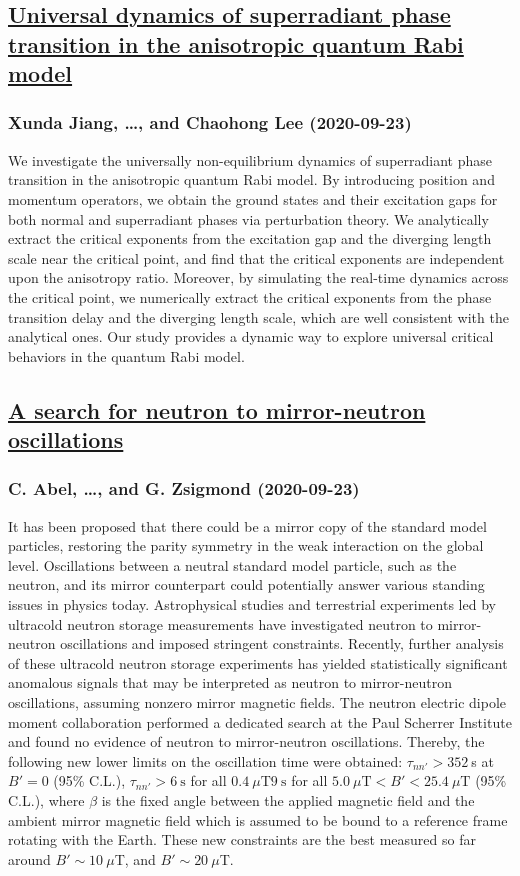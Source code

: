 \subsection*{\href{http://arxiv.org/abs/2009.11047v1}{Universal dynamics of superradiant phase transition in the anisotropic  quantum Rabi model}}
\subsubsection*{Xunda Jiang, \dots, and Chaohong Lee (2020-09-23)}
We investigate the universally non-equilibrium dynamics of superradiant phase
transition in the anisotropic quantum Rabi model. By introducing position and
momentum operators, we obtain the ground states and their excitation gaps for
both normal and superradiant phases via perturbation theory. We analytically
extract the critical exponents from the excitation gap and the diverging length
scale near the critical point, and find that the critical exponents are
independent upon the anisotropy ratio. Moreover, by simulating the real-time
dynamics across the critical point, we numerically extract the critical
exponents from the phase transition delay and the diverging length scale, which
are well consistent with the analytical ones. Our study provides a dynamic way
to explore universal critical behaviors in the quantum Rabi model.

\subsection*{\href{http://arxiv.org/abs/2009.11046v1}{A search for neutron to mirror-neutron oscillations}}
\subsubsection*{C. Abel, \dots, and G. Zsigmond (2020-09-23)}
It has been proposed that there could be a mirror copy of the standard model
particles, restoring the parity symmetry in the weak interaction on the global
level. Oscillations between a neutral standard model particle, such as the
neutron, and its mirror counterpart could potentially answer various standing
issues in physics today. Astrophysical studies and terrestrial experiments led
by ultracold neutron storage measurements have investigated neutron to
mirror-neutron oscillations and imposed stringent constraints. Recently,
further analysis of these ultracold neutron storage experiments has yielded
statistically significant anomalous signals that may be interpreted as neutron
to mirror-neutron oscillations, assuming nonzero mirror magnetic fields. The
neutron electric dipole moment collaboration performed a dedicated search at
the Paul Scherrer Institute and found no evidence of neutron to mirror-neutron
oscillations. Thereby, the following new lower limits on the oscillation time
were obtained: $\tau_{nn'} > 352~$s at $B'=0$ (95\% C.L.), $\tau_{nn'} >
6~\text{s}$ for all $0.4~\mu\text{T}9~\text{s}$ for all
$5.0~\mu\text{T}<B'<25.4~\mu\text{T}$ (95\% C.L.), where $\beta$ is the fixed
angle between the applied magnetic field and the ambient mirror magnetic field
which is assumed to be bound to a reference frame rotating with the Earth.
These new constraints are the best measured so far around $B'\sim10~\mu$T, and
$B'\sim20~\mu$T.

